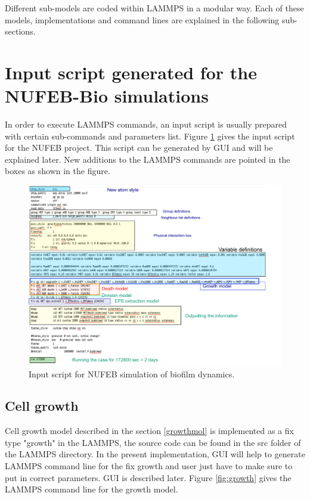 \documentclass[11pt,a4paper,openright]{article}
\begin{document}
Different sub-models are coded within LAMMPS in a modular way. Each of these models, implementations and command lines are explained in the following sub-sections.


\section{Input script generated for the NUFEB-Bio simulations}
In order to execute LAMMPS commands, an input script is usually prepared with certain sub-commands and parameters list. 
Figure \ref{fig:inputscript} gives the input script for the NUFEB project. This script can be generated by GUI and will be explained later. New additions to the LAMMPS commands are pointed in the boxes as shown in the figure. 

\begin{figure}[H]
\begin{center}
  \includegraphics[width=0.9\columnwidth]{Figs/Inputscript.pdf}
\caption{Input script for NUFEB simulation of biofilm dynamics.}
\label{fig:inputscript}       %
\end{center}
\end{figure}  


\subsection{Cell growth}
Cell growth model described in the section \ref{growthmol} is implemented as a fix type "growth" in the LAMMPS, the source code can be found in the src folder of the LAMMPS directory. In the present implementation, GUI will help to generate LAMMPS command line for the fix growth and user just have to make sure to put in correct parameters. GUI is described later. Figure \ref{fig:growth} gives the LAMMPS command line for the growth model.
\end{document}
